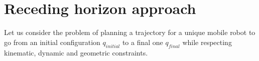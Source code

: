 
\section{Receding horizon approach}


Let us consider the problem of planning a trajectory for a unique mobile robot
to go from an initial configuration $q_{initial}$ to a final one $q_{final}$ while
respecting kinematic, dynamic and geometric constraints.




